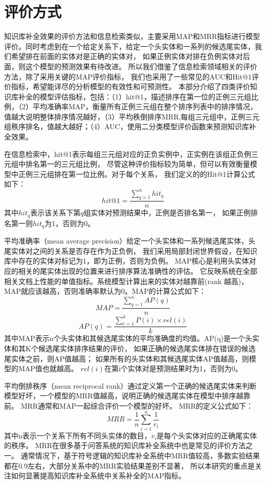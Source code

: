 \section{评价方式}
\label{sec:metrics}
知识库补全效果的评价方法和信息检索类似，主要采用MAP和MRR\cite{Gardner2014}指标进行模型评价。同时考虑到在一个给定关系下，给定一个头实体和一系列的候选尾实体，我们希望排在前面的实体对是正确的实体对，
如果正例实体对排在负例实体对后面，则这个模型的预测效果有待改进。
所以我们借鉴了信息检索领域相关的评价方法，除了采用关键的MAP评价指标，
我们也采用了一些常见的AUC和Hit@1评价指标，希望能详尽的分析模型的有效性和可预测性。
本部分介绍了四类评价知识库补全的模型评估指标，包括：（1）hit@1，描述排序在第一位的正例三元组比例，（2）平均准确率MAP，衡量所有正例三元组在整个排序列表中的排序情况，值越大说明整体排序情况越好，（3）平均秩倒排序MRR,每组三元组中，正例三元组秩序排名，值越大越好；（4）AUC，使用二分类模型评价函数来预测知识库补全效果。

在信息检索中，hit@1表示每组三元组对应的正负实例中，正实例在该组正负例三元组中排名第一的三元组比例，
尽管这种评价指标较为简单，但可以有效衡量模型中正例三元组排在第一位比例。对于每个关系，
我们定义的的Hit@1计算公式如下：
$$hit@1=\frac{\sum_{q=1}^n{hit_q}}{n}$$
其中$hit_q$表示该关系下第$q$组实体对预测结果中，正例是否排名第一，
如果正例排名第一则$hit_q$为1，否则为0。

平均准确率（mean average precision）给定一个头实体和一系列候选尾实体，头尾实体对之间的关系是否存在作为正负例，
我们采用局部封闭世界假设，在知识库中存在的实体对标记为1，即为正例，否则为负例。
MAP核心是利用头实体对应的相关的尾实体出现的位置来进行排序算法准确性的评估。
它反映系统在全部相关文档上性能的单值指标。系统模型计算出来的实体对越靠前(rank 越高)，MAP就应该越高，否则准确率默认为0。MAP的计算公式如下：
$$MAP=\frac{\sum_{q=1}^nAP(q)}{n}$$
$$AP(q)=\frac{\sum_{i=1}^kP(i)\times rel(i)}{k}$$
其中MAP表示n个头实体和其候选尾实体的平均准确度的均值。AP(q)是一个头实体和其K个候选尾实体排序结果的评价，
如果正确的候选尾实体排在错误的候选尾实体之前，则AP值越高；
如果所有的头实体和其候选尾实体AP值越高，则模型的MAP值也就越高。
$rel(i)$在第i个实体对是预测结果时为1，否则为0。


平均倒排秩序（mean reciprocal rank）通过定义第一个正确的候选尾实体来判断模型好坏，一个模型的MRR值越高，说明正确的候选尾实体在模型中排序越靠前。
MRR通常和MAP一起综合评价一个模型的好坏。
MRR的定义公式如下：
$$MRR=\frac{1}{n} \sum_{i=1}^n \frac{1}{r_i}$$
其中n表示一个关系下所有不同头实体的数目，$r_i$是每个头实体对应的正确尾实体的秩序。
MRR在很多基于问答系统的知识库补全系统\cite{West2014}中也是常见的评价方法之一。
通常情况下，基于符号逻辑的知识库补全系统中MRR值较高，多数实验结果都在0.9左右，大部分关系中的MRR实验结果差别不显著，
所以本研究的重点是关注如何显著提高知识库补全系统中关系补全的MAP指标。



